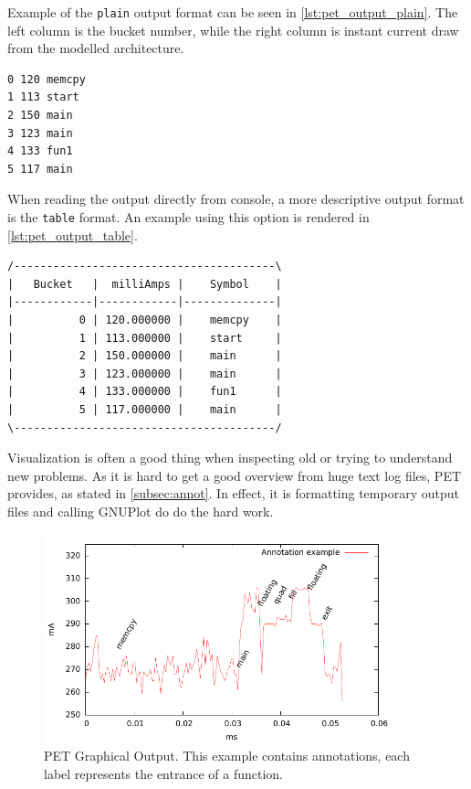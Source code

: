 Example of the \texttt{plain} output format can be seen in
\autoref{lst:pet_output_plain}. The left column is the bucket number, while the
right column is instant current draw from the modelled architecture.

\begin{lstlisting}[float=hbt,label={lst:pet_output_plain},caption={PET Plain Output with function annotations.}]
0 120 memcpy
1 113 start
2 150 main
3 123 main
4 133 fun1
5 117 main
\end{lstlisting}

When reading the output directly from console, a more descriptive output format
is the \texttt{table} format. An example using this option is rendered in
\autoref{lst:pet_output_table}.

\begin{lstlisting}[float=hbt,label={lst:pet_output_table},caption={PET Table Output with function annotations.}]
/----------------------------------------\
|   Bucket   |  milliAmps |    Symbol    |
|------------|------------|--------------|
|          0 | 120.000000 |    memcpy    |
|          1 | 113.000000 |    start     |
|          2 | 150.000000 |    main      |
|          3 | 123.000000 |    main      |
|          4 | 133.000000 |    fun1      |
|          5 | 117.000000 |    main      |
\----------------------------------------/
\end{lstlisting}

Visualization is often a good thing when inspecting old or trying to understand
new problems. As it is hard to get a good overview from huge text log files, PET
provides, as stated in \autoref{subsec:annot}. In effect, it is formatting
temporary output files and calling GNUPlot do do the hard work.

\begin{figure}[htb]
    \centering
    \includegraphics[width=0.9\textwidth]{figs/annot.pdf}
    \caption{PET Graphical Output. This example contains annotations, each label
    represents the entrance of a function.}
    \label{fig:annot}
\end{figure}

